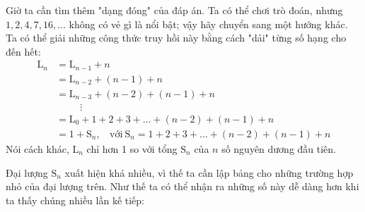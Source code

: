 Giờ ta cần tìm thêm "dạng đóng" của đáp án. Ta có thể chơi trò đoán, nhưng $1, 2, 4, 7, 16, \dots$ không có vẻ gì là nổi bật; vậy hãy chuyển sang một hướng khác. Ta có thể giải những công thức truy hồi này bằng cách "dải" từng số hạng cho đến hết:
\begin{equation*}
    \begin{split}
        \mathrm{L}_n & = \mathrm{L}_{n - 1} + n \\
        & = \mathrm{L}_{n - 2} + (n - 1) + n \\
        & = \mathrm{L}_{n - 3} + (n - 2) + (n - 1) + n \\
        & \ \ \ \ \ \ \ \ \ \ \ \vdots \\
        & = \mathrm{L}_0 + 1 + 2 + 3 + \dots + (n - 2) + (n - 1) + n \\
        & = 1 + \mathrm{S}_n, \ \ \ \ \text{với} \ \mathrm{S}_n = 1 + 2 + 3 + \dots + (n - 2) + (n - 1) + n
    \end{split}
\end{equation*}
Nói cách khác, $\mathrm{L}_{n}$ chỉ hơn 1 so với tổng $\mathrm{S}_n$ của $n$ số nguyên dương đầu tiên.

Đại lượng $\mathrm{S}_n$ xuất hiện khá nhiều, vì thế ta cần lập bảng cho những trường hợp nhỏ của đại lượng trên. Như thế ta có thể nhận ra những số này dễ dàng hơn khi ta thấy chúng nhiều lần kế tiếp: